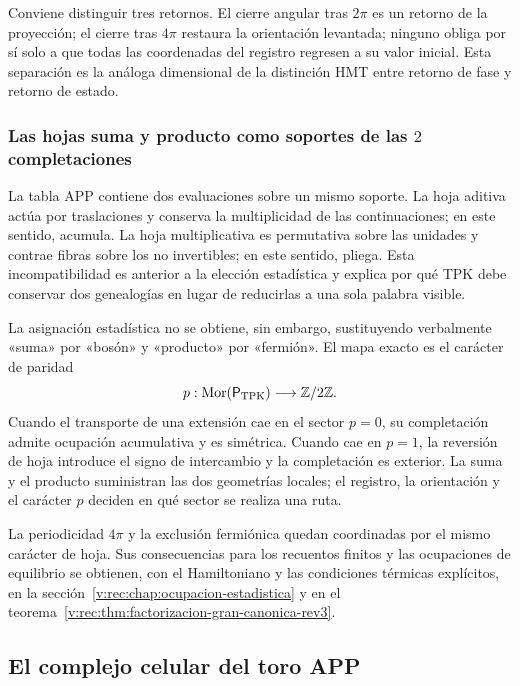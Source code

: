 Conviene distinguir tres retornos. El cierre angular tras \(2\pi\) es un
retorno de la proyección; el cierre tras \(4\pi\) restaura la orientación
levantada; ninguno obliga por sí solo a que todas las coordenadas del registro
regresen a su valor inicial. Esta separación es la análoga dimensional de la
distinción HMT entre retorno de fase y retorno de estado.

\subsubsection{Las hojas suma y producto como soportes de las \(2\) completaciones}
\label{v:rec:completaciones:section:06}

La tabla APP contiene dos evaluaciones sobre un mismo soporte. La hoja
aditiva actúa por traslaciones y conserva la multiplicidad de las
continuaciones; en este sentido, acumula. La hoja multiplicativa es
permutativa sobre las unidades y contrae fibras sobre los no invertibles; en
este sentido, pliega. Esta incompatibilidad es anterior a la elección
estadística y explica por qué TPK debe conservar dos genealogías en lugar de
reducirlas a una sola palabra visible.

La asignación estadística no se obtiene, sin embargo, sustituyendo
verbalmente «suma» por «bosón» y «producto» por «fermión». El mapa exacto es
el carácter de paridad
\[
 p:\operatorname{Mor}(\mathsf P_{\rm TPK})\longrightarrow\mathbb Z/2\mathbb Z.
\]
Cuando el transporte de una extensión cae en el sector \(p=0\), su
completación admite ocupación acumulativa y es simétrica. Cuando cae en
\(p=1\), la reversión de hoja introduce el signo de intercambio y la
completación es exterior. La suma y el producto suministran las dos
geometrías locales; el registro, la orientación y el carácter \(p\) deciden en
qué sector se realiza una ruta.

La periodicidad \(4\pi\) y la exclusión fermiónica quedan coordinadas por
el mismo carácter de hoja. Sus consecuencias para los recuentos finitos y
las ocupaciones de equilibrio se obtienen, con el Hamiltoniano y las
condiciones térmicas explícitos, en la
sección~\ref{v:rec:chap:ocupacion-estadistica} y en el
teorema~\ref{v:rec:thm:factorizacion-gran-canonica-rev3}.

\subsection{El complejo celular del toro APP}
\label{v:rec:completaciones:section:08}

